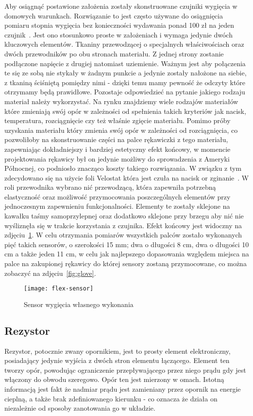 	Aby osiągnąć postawione założenia zostały skonstruowane czujniki wygięcia w domowych warunkach. Rozwiązanie to jest często używane do osiągnięcia pomiaru stopnia wygięcia bez konieczności wydawania ponad 100 zł na jeden czujnik~\cite{flex-sensor}. Jest ono stosunkowo proste w założeniach i wymaga jedynie dwóch kluczowych elementów. Tkaniny przewodzącej o specjalnych właściwościach oraz dwóch przewodników po obu stronach materiału. Z jednej strony zostanie podłączone napięcie z drugiej natomiast uziemienie. Ważnym jest aby połączenia te się ze sobą nie stykały w żadnym punkcie a jedynie zostały nałożone na siebie, z tkaniną ściśniętą pomiędzy nimi - dzięki temu mamy pewność że odczyty które otrzymamy będą prawidłowe. Pozostaje odpowiedzieć na pytanie jakiego rodzaju materiał należy wykorzystać. Na rynku znajdziemy wiele rodzajów materiałów które zmieniają swój opór w zależności od spełnienia takich kryteriów jak nacisk, temperatura, rozciągnięcie czy też właśnie zgięcie materiału. Pomimo próby uzyskania materiału który zmienia swój opór w zależności od rozciągnięcia, co pozwoliłoby na skonstruowanie części na palce rękawiczki z tego materiału, zapewniając dokładniejszy i bardziej estetyczny efekt końcowy, w momencie projektowania rękawicy był on jedynie możliwy do sprowadzenia z Ameryki Północnej, co podniosło znacząco koszty takiego rozwiązania. W związku z tym zdecydowano się na użycie foli Velostat która jest czuła na nacisk or zginanie~\cite{velostat}. W roli przewodnika wybrano nić przewodzącą, która zapewniła potrzebną elastyczność oraz możliwość przymocowania poszczególnych elementów przy jednoczesnym zapewnieniu funkcjonalności. Elementy te zostały sklejone na kawałku taśmy samoprzylepnej oraz dodatkowo sklejone przy brzegu aby nić nie wyśliznęła się w trakcie korzystania z czujnika. Efekt końcowy jest widoczny na zdjęciu~\ref{fig:sensor}. W celu otrzymania pomiarów wszystkich palców zostało wykonanych pięć takich sensorów, o szerokości 15 mm; dwa o długości 8 cm, dwa o długości 10 cm a także jeden 11 cm, w celu jak najlepszego dopasowania względem miejsca na palce na zakupionej rękawicy do której sensory zostaną przymocowane, co można zobaczyć na zdjęciu~\ref{fig:glove}.
	
\begin{figure}[h]
\centering
\texttt{[image: flex-sensor]}
\caption{Sensor wygięcia własnego wykonania}
\label{fig:sensor}
\end{figure}	

	\subsection{Rezystor}
	\label{subsec:rezystor}	
	Rezystor, potocznie zwany opornikiem, jest to prosty element elektroniczny, posiadający jedynie wyjścia z dwóch stron elementu łączącego. Element ten tworzy opór, powodując ograniczenie przepływającego przez niego prądu gdy jest włączony do obwodu szeregowo. Opór ten jest mierzony w omach. Istotną informacją jest fakt że nadmiar prądu jest zamieniany przez opornik na energie cieplną, a także brak zdefiniowanego kierunku - co oznacza że działa on niezależnie od sposoby zanotowania go w układzie.
	
